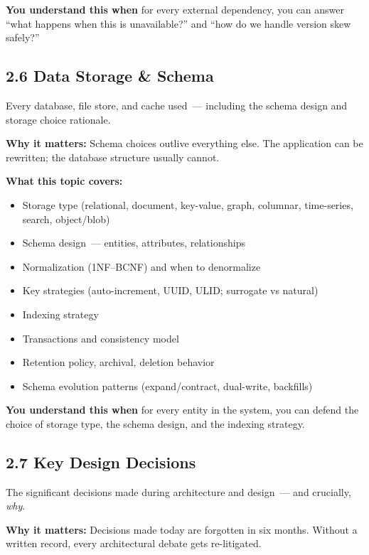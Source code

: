 \noindent{}\textbf{You understand this when} for every external dependency, you can answer ``what happens when this is unavailable?'' and ``how do we handle version skew safely?''

\subsection*{2.6 Data Storage \& Schema}\label{project-planning-guide:26-data-storage--schema}

Every database, file store, and cache used~--- including the schema design and storage choice rationale.

\textbf{Why it matters:} Schema choices outlive everything else. The application can be rewritten; the database structure usually cannot.

\textbf{What this topic covers:}

\begin{itemize}
\tightlist
\item
  Storage type (relational, document, key-value, graph, columnar, time-series, search, object/blob)
\item
  Schema design~--- entities, attributes, relationships
\item
  Normalization (1NF--BCNF) and when to denormalize
\item
  Key strategies (auto-increment, UUID, ULID; surrogate vs natural)
\item
  Indexing strategy
\item
  Transactions and consistency model
\item
  Retention policy, archival, deletion behavior
\item
  Schema evolution patterns (expand/contract, dual-write, backfills)
\end{itemize}

\noindent{}\textbf{You understand this when} for every entity in the system, you can defend the choice of storage type, the schema design, and the indexing strategy.

\subsection*{2.7 Key Design Decisions}\label{project-planning-guide:27-key-design-decisions}

The significant decisions made during architecture and design~--- and crucially, \emph{why}.

\textbf{Why it matters:} Decisions made today are forgotten in six months. Without a written record, every architectural debate gets re-litigated.

